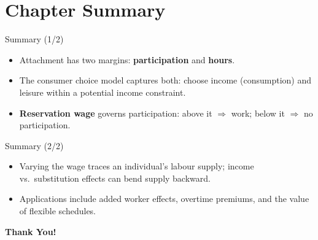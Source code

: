 \documentclass[aspectratio=169]{beamer}
\begin{document}
\section{Chapter Summary}

\begin{frame}{Summary (1/2)}
\transfade
\begin{itemize}[<+->]
  \item Attachment has two margins: \textbf{participation} and \textbf{hours}.
  \item The consumer choice model captures both: choose income (consumption) and leisure within a potential income constraint.
  \item \textbf{Reservation wage} governs participation: above it \(\Rightarrow\) work; below it \(\Rightarrow\) no participation.
\end{itemize}

\end{frame}

\begin{frame}{Summary (2/2)}
\transfade
\begin{itemize}[<+->]
  \item Varying the wage traces an individual’s labour supply; income vs.\ substitution effects can bend supply backward.
  \item Applications include added worker effects, overtime premiums, and the value of flexible schedules.
\end{itemize}

\end{frame}

\begin{frame}
\centering
\Huge{\textbf{Thank You!}} \\

\end{frame}
\end{document}
